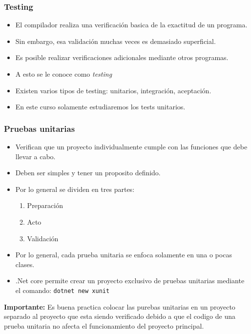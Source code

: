 \documentclass{beamer}
\begin{document}
\begin{frame}
    \frametitle{Testing}
    \begin{itemize}
        \item{El compilador realiza una verificaci\'on basica
        de la exactitud de un programa.}
        \item{Sin embargo, esa validaci\'on muchas veces es
        demasiado superficial.}
        \item{Es posible realizar verificaciones adicionales mediante
        otros programas.}
        \item{A esto se le conoce como \emph{testing}}
        \item{Existen varios tipos de testing: unitarios, integraci\'on,
        aceptaci\'on.}
        \item{En este curso solamente estudiaremos los tests unitarios.}
    \end{itemize}
\end{frame}

\begin{frame}
    \frametitle{Pruebas unitarias}
    \begin{itemize}
        \item{Verifican que un proyecto individualmente cumple con las
        funciones que debe llevar a cabo.}
        \item{Deben ser simples y tener un proposito definido.}
        \item{Por lo general se dividen en tres partes:
            \begin{enumerate}
                \item{Preparaci\'on}
                \item{Acto}
                \item{Validaci\'on}
            \end{enumerate}
        }
        \item{Por lo general, cada prueba unitaria se enfoca solamente
        en una o pocas clases.}
        \item{.Net core permite crear un proyecto exclusivo de pruebas
        unitarias mediante el comando: \texttt{dotnet new xunit}}
    \end{itemize}
    {\bf Importante:} Es buena practica colocar las purebas unitarias en
    un proyecto separado al proyecto que esta siendo verificado debido
    a que el codigo de una prueba unitaria no afecta el funcionamiento
    del proyecto principal.
\end{frame}
\end{document}

